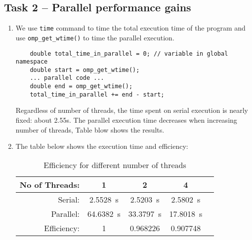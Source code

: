 \documentclass[a4paper, DIV12, headsepline]{scrartcl}
\begin{document}
\subsection*{Task 2 -- Parallel performance gains}
\begin{enumerate}
\item We use \texttt{time} command to time the total execution time of the program and use \texttt{omp\_get\_wtime()} to time the parallel execution. 
\begin{verbatim}
    double total_time_in_parallel = 0; // variable in global namespace
    double start = omp_get_wtime();
    ... parallel code ...
    double end = omp_get_wtime();
    total_time_in_parallel += end - start;
\end{verbatim}
Regardless of number of threads, the time spent on serial execution is nearly fixed: about 2.55s. The parallel execution time decreases when increasing number of threads, Table blow shows the results.

%
%

\item The table below shows the execution time and efficiency:
\begin{table}[htbp]
\centering
{}
\begin{tabular}{rSSSS}
\hline
No of Threads: & {1} & {2} & {4} \\
\hline
Serial: & \SI{2.5528}{s} & \SI{2.5203}{s} & \SI{2.5802}{s}  \\
Parallel: & \SI{64.6382}{s} & \SI{33.3797}{s} & \SI{17.8018}{s}  \\
Efficiency: & {1} & {0.968226} & {0.907748}  \\
\hline
\end{tabular}
\caption{Efficiency for different number of threads}
\label{tab:tab22}
\end{table}
\end{enumerate}

% 
% 
% 
\end{document}
